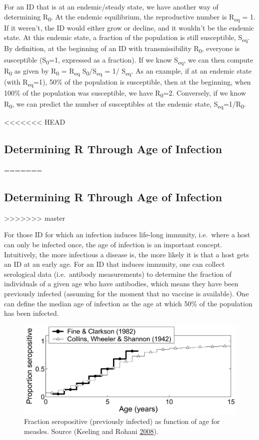 \documentclass[]{book}
\theoremstyle{definition}
\theoremstyle{definition}
\theoremstyle{definition}
\theoremstyle{remark}
\begin{document}
For an ID that is at an endemic/steady state, we have another way of
determining R\textsubscript{0}. At the endemic equilibrium, the
reproductive number is R\textsubscript{eq} = 1. If it weren't, the ID
would either grow or decline, and it wouldn't be the endemic state. At
this endemic state, a fraction of the population is still susceptible,
S\textsubscript{eq}. By definition, at the beginning of an ID with
transmissibility R\textsubscript{0}, everyone is susceptible
(S\textsubscript{0}=1, expressed as a fraction). If we know
S\textsubscript{eq}, we can then compute R\textsubscript{0} as given by
R\textsubscript{0} = R\textsubscript{eq}
S\textsubscript{0}/S\textsubscript{eq} = 1/ S\textsubscript{eq}. As an
example, if at an endemic state (with R\textsubscript{eq}=1), 50\% of
the population is susceptible, then at the beginning, when 100\% of the
population was susceptible, we have R\textsubscript{0}=2. Conversely, if
we know R\textsubscript{0}, we can predict the number of susceptibles at
the endemic state, S\textsubscript{eq}=1/R\textsubscript{0}.

<<<<<<< HEAD
\hypertarget{determining-r-through-age-of-infection}{%
\subsection{Determining R Through Age of
Infection}\label{determining-r-through-age-of-infection}}
=======
\subsection{Determining R Through Age of
Infection}\label{determining-r-through-age-of-infection}
>>>>>>> master

For those ID for which an infection induces life-long immunity,
i.e.~where a host can only be infected once, the age of infection is an
important concept. Intuitively, the more infectious a disease is, the
more likely it is that a host gets an ID at an early age. For an ID that
induces immunity, one can collect serological data (i.e.~antibody
measurements) to determine the fraction of individuals of a given age
who have antibodies, which means they have been previously infected
(assuming for the moment that no vaccine is available). One can define
the median age of infection as the age at which 50\% of the population
has been infected.

\begin{figure}
\centering
\includegraphics{./images/R0age.png}
\caption{\label{fig:R0age}Fraction seropositive (previously infected) as
function of age for measles. Source (Keeling and Rohani
\protect\hyperlink{ref-keeling08}{2008}).}
\end{figure}
\end{document}
